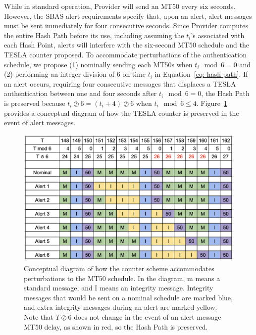 \documentclass[APA,STIX1COL]{IONjournal/ION-APA Template}
\begin{document}
			While in standard operation, Provider will send an MT50 every six seconds.
			However, the SBAS alert requirements specify that, upon an alert, alert messages must be sent immediately for four consecutive seconds.
			Since Provider computes the entire Hash Path before its use, including assuming the $t_i$'s associated with each Hash Point, alerts will interfere with the six-second MT50 schedule and the TESLA counter proposed.
			To accommodate perturbations of the authentication schedule, we propose (1) nominally sending each MT50s when $t_i \mod 6 = 0$ and (2) performing an integer division of 6 on time $t_i$ in Equation~\eqref{eq: hash path}.
			If an alert occurs, requiring four consecutive messages that displaces a TESLA authentication between one and four seconds after $t_i \mod 6 = 0$, the Hash Path is preserved because $t_i \oslash 6 = (t_i + 4) \oslash 6$ when $t_i \mod 6 \leq 4 $.
			Figure~\ref{fig: alert schedule} provides a conceptual diagram of how the TESLA counter is preserved in the event of alert messages.

			\begin{figure}
				\centering
				\includegraphics[width=0.5\linewidth]{fig/alertschedule.png}
				\caption{Conceptual diagram of how the counter scheme accommodates perturbations to the MT50 schedule. In the diagram, m means a standard message, and I means an integrity message. Integrity messages that would be sent on a nominal schedule are marked blue, and extra integrity messages during an alert are marked yellow. Note that $T \oslash 6$ does not change in the event of an alert message MT50 delay, as shown in red, so the Hash Path is preserved.}
				\label{fig: alert schedule}
			\end{figure}
\end{document}
